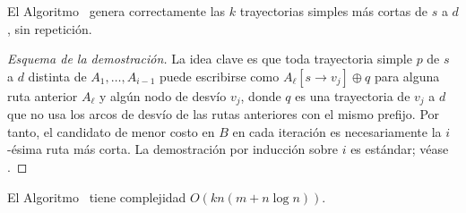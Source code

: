 \begin{theorem}
El Algoritmo~ genera correctamente las $k$ trayectorias simples más cortas de $s$ a $d$, sin repetición.
\end{theorem}

\begin{proof}[Esquema de la demostración]
La idea clave es que toda trayectoria simple $p$ de $s$ a $d$ distinta de $A_1, \ldots, A_{i-1}$ puede escribirse como $A_\ell[s \to v_j] \oplus q$ para alguna ruta anterior $A_\ell$ y algún nodo de desvío $v_j$, donde $q$ es una trayectoria de $v_j$ a $d$ que no usa los arcos de desvío de las rutas anteriores con el mismo prefijo. Por tanto, el candidato de menor costo en $B$ en cada iteración es necesariamente la $i$-ésima ruta más corta. La demostración por inducción sobre $i$ es estándar; véase \cite{Yen1971}.
\end{proof}

\begin{proposition}
El Algoritmo~ tiene complejidad $O(k n (m + n \log n))$.
\end{proposition}
